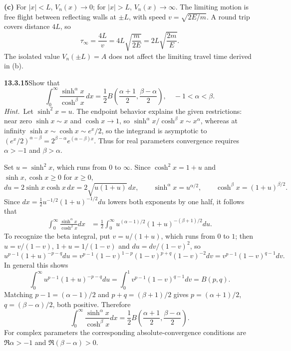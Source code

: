 \textbf{(c)} For $|x|<L$, $V_n(x)\to0$; for $|x|>L$,
$V_n(x)\to\infty$.  The limiting motion is free flight between
reflecting walls at $\pm L$, with speed $v=\sqrt{2E/m}$.
A round trip covers distance $4L$, so
\[
\boxed{\tau_\infty=\frac{4L}{v}=4L\sqrt{\frac m{2E}}
=2L\sqrt{\frac{2m}E}}.
\]
The isolated value $V_n(\pm L)=A$ does not affect the limiting
travel time derived in (b).


\par\bigskip
\noindent\textbf{13.3.15}\quad Show that
\[
\int_{0}^{\infty}\frac{\sinh^{\alpha}x}{\cosh^{\beta}x}\,dx
=\frac{1}{2}B\left(\frac{\alpha+1}{2},\frac{\beta-\alpha}{2}\right),
\quad-1<\alpha<\beta.
\]
\emph{Hint.}~Let $\sinh^{2}x=u$.
\solution
The endpoint behavior explains the given restrictions: near zero
$\sinh x\sim x$ and $\cosh x\to1$, so
$\sinh^\alpha x/\cosh^\beta x\sim x^\alpha$, whereas at infinity
$\sinh x\sim\cosh x\sim e^x/2$, so the integrand is asymptotic to
$(e^x/2)^{\alpha-\beta}=2^{\beta-\alpha}e^{(\alpha-\beta)x}$.
Thus for real parameters convergence requires $\alpha>-1$ and
$\beta>\alpha$.

Set $u=\sinh^2x$, which runs from $0$ to $\infty$.  Since
$\cosh^2x=1+u$ and $\sinh x,\cosh x\ge0$ for $x\ge0$,
\[
du=2\sinh x\cosh x\,dx=2\sqrt{u(1+u)}\,dx,
\qquad\sinh^\alpha x=u^{\alpha/2},\qquad\cosh^\beta x=(1+u)^{\beta/2}.
\]
Since $dx=\frac12u^{-1/2}(1+u)^{-1/2}du$ lowers both exponents by
one half, it follows that
\begin{align*}
\int_0^\infty\frac{\sinh^\alpha x}{\cosh^\beta x}dx
&=\frac12\int_0^\infty
u^{(\alpha-1)/2}(1+u)^{-(\beta+1)/2}du.
\end{align*}
To recognize the beta integral, put $v=u/(1+u)$, which runs from
$0$ to $1$; then $u=v/(1-v)$, $1+u=1/(1-v)$ and
$du=dv/(1-v)^2$, so
\[
u^{p-1}(1+u)^{-p-q}du
=v^{p-1}(1-v)^{1-p}(1-v)^{p+q}(1-v)^{-2}dv
=v^{p-1}(1-v)^{q-1}dv.
\]
In general this shows
\[
\int_0^\infty u^{p-1}(1+u)^{-p-q}du
=\int_0^1v^{p-1}(1-v)^{q-1}dv=B(p,q).
\]
Matching $p-1=(\alpha-1)/2$ and $p+q=(\beta+1)/2$ gives
$p=(\alpha+1)/2$, $q=(\beta-\alpha)/2$, both positive.
Therefore
\[
\boxed{\int_0^\infty\frac{\sinh^\alpha x}{\cosh^\beta x}dx
=\frac12 B\left(\frac{\alpha+1}2,\frac{\beta-\alpha}2\right)}.
\]
For complex parameters the corresponding absolute-convergence
conditions are $\Re\alpha>-1$ and $\Re(\beta-\alpha)>0$.


